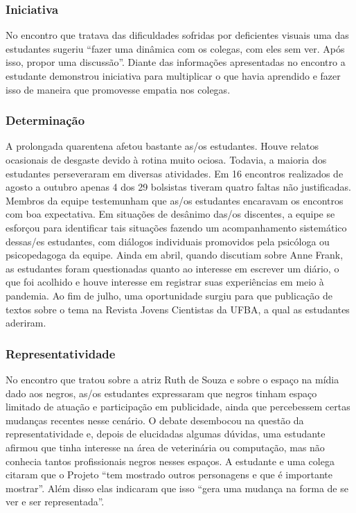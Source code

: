 \documentclass[
]{book}
\begin{document}
\hypertarget{iniciativa}{%
\subsubsection*{Iniciativa}\label{iniciativa}}

No encontro que tratava das dificuldades sofridas por deficientes visuais uma das estudantes sugeriu ``fazer uma dinâmica com os colegas, com eles sem ver. Após isso, propor uma discussão''. Diante das informações apresentadas no encontro a estudante demonstrou iniciativa para multiplicar o que havia aprendido e fazer isso de maneira que promovesse empatia nos colegas.

\hypertarget{determinauxe7uxe3o}{%
\subsubsection*{Determinação}\label{determinauxe7uxe3o}}

A prolongada quarentena afetou bastante as/os estudantes. Houve relatos ocasionais de desgaste devido à rotina muito ociosa. Todavia, a maioria dos estudantes perseveraram em diversas atividades. Em 16 encontros realizados de agosto a outubro apenas 4 dos 29 bolsistas tiveram quatro faltas não justificadas. Membros da equipe testemunham que as/os estudantes encaravam os encontros com boa expectativa. Em situações de desânimo das/os discentes, a equipe se esforçou para identificar tais situações fazendo um acompanhamento sistemático dessas/es estudantes, com diálogos individuais promovidos pela psicóloga ou psicopedagoga da equipe. Ainda em abril, quando discutiam sobre Anne Frank, as estudantes foram questionadas quanto ao interesse em escrever um diário, o que foi acolhido e houve interesse em registrar suas experiências em meio à pandemia. Ao fim de julho, uma oportunidade surgiu para que publicação de textos sobre o tema na Revista Jovens Cientistas da UFBA, a qual as estudantes aderiram.

\hypertarget{representatividade}{%
\subsubsection*{Representatividade}\label{representatividade}}

No encontro que tratou sobre a atriz Ruth de Souza e sobre o espaço na mídia dado aos negros, as/os estudantes expressaram que negros tinham espaço limitado de atuação e participação em publicidade, ainda que percebessem certas mudanças recentes nesse cenário. O debate desembocou na questão da representatividade e, depois de elucidadas algumas dúvidas, uma estudante afirmou que tinha interesse na área de veterinária ou computação, mas não conhecia tantos profissionais negros nesses espaços. A estudante e uma colega citaram que o Projeto ``tem mostrado outros personagens e que é importante mostrar''. Além disso elas indicaram que isso ``gera uma mudança na forma de se ver e ser representada''.
\end{document}
